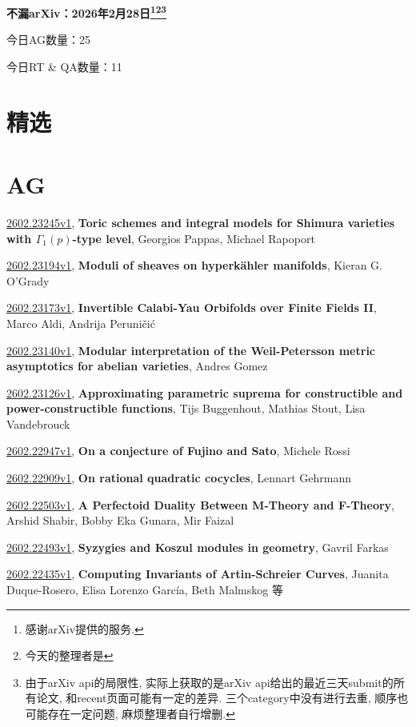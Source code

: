 \documentclass[9pt, a4paper]{article}
\theoremstyle{plain}
\theoremstyle{definition}
\theoremstyle{remark}
\newcommand{\arxiv}[3]{\href{https://arxiv.org/abs/#1}{#1}, \textbf{\textcolor{arxivblue}{#2}}, #3}
\newcommand{\AGnumber}{25}
\newcommand{\RTQAnumber}{11}
\newcommand{\NewestDate}{2026年2月28日}
\newcommand{\todayarXiver}{} %
\begin{document}
\begin{center}
    \Huge\textbf{不漏arXiv：\NewestDate\footnote{感谢arXiv提供的服务.}\footnote{今天的整理者是\todayarXiver}\footnote{由于arXiv api的局限性, 实际上获取的是arXiv api给出的最近三天submit的所有论文, 和recent页面可能有一定的差异. 三个category中没有进行去重, 顺序也可能存在一定问题, 麻烦整理者自行增删.}} \\
\end{center}

\setcounter{section}{-1}

\begin{center}
    今日AG数量：\AGnumber
    
    今日RT \& QA数量：\RTQAnumber
    
\end{center}


\section{精选}


\section{AG}
\arxiv{2602.23245v1}{Toric schemes and integral models for Shimura varieties with $Γ_1(p)$-type level}{Georgios Pappas, Michael Rapoport}

\arxiv{2602.23194v1}{Moduli of sheaves on hyperkähler manifolds}{Kieran G. O'Grady}

\arxiv{2602.23173v1}{Invertible Calabi-Yau Orbifolds over Finite Fields II}{Marco Aldi, Andrija Peruničić}

\arxiv{2602.23140v1}{Modular interpretation of the Weil-Petersson metric asymptotics for abelian varieties}{Andres Gomez}

\arxiv{2602.23126v1}{Approximating parametric suprema for constructible and power-constructible functions}{Tijs Buggenhout, Mathias Stout, Lisa Vandebrouck}

\arxiv{2602.22947v1}{On a conjecture of Fujino and Sato}{Michele Rossi}

\arxiv{2602.22909v1}{On rational quadratic cocycles}{Lennart Gehrmann}

\arxiv{2602.22503v1}{A Perfectoid Duality Between M-Theory and F-Theory}{Arshid Shabir, Bobby Eka Gunara, Mir Faizal}

\arxiv{2602.22493v1}{Syzygies and Koszul modules in geometry}{Gavril Farkas}

\arxiv{2602.22435v1}{Computing Invariants of Artin-Schreier Curves}{Juanita Duque-Rosero, Elisa Lorenzo García, Beth Malmskog 等}
\end{document}
